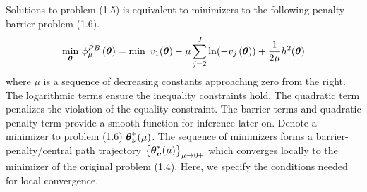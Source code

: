 Solutions to problem (1.5) is equivalent to minimizers to the following penalty-barrier problem (1.6).
\begin{equation}
\begin{gathered}
\min_{\boldsymbol{\theta}} \, \phi^{PB}_{\mu}\left(\boldsymbol{\theta}\right) = \min \,\,v_1(\boldsymbol{\theta}) - \mu \sum_{j=2}^J \ln (-v_j\left( \boldsymbol{\theta}\right)) + \frac{1}{2\mu} h^2(\boldsymbol{\theta})
\end{gathered}
\end{equation}
where $\mu$ is a sequence of decreasing constants approaching zero from the right. The logarithmic terms ensure the inequality constraints hold. The quadratic term penalizes the violation of the equality constraint. The barrier terms and quadratic penalty term provide a smooth function for inference later on. Denote a minimizer to problem (1.6) $\boldsymbol{\theta}^{*}_{\boldsymbol{\nu}}(\mu)$. The sequence of minimizers forms a barrier-penalty/central path trajectory $\left\{ \boldsymbol{\theta}_{\boldsymbol{\nu}}^*(\mu)\right\}_{\mu \to 0+}$ which converges locally to the minimizer of the original problem (1.4). Here, we specify the conditions needed for local convergence. 
